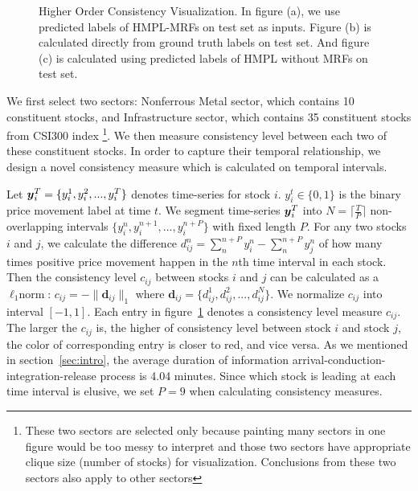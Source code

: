 \documentclass[sigconf, anonymous, review]{acmart}
\begin{document}
\begin{figure}[t]
\begin{tabular}{ccc}
  \end{tabular}
  \caption{\label{fig:consistency} Higher Order Consistency
    Visualization. In figure (a), we use predicted labels of
    HMPL-MRFs on test set as inputs. Figure (b) is calculated
    directly from ground truth labels on test set. And figure (c)
    is calculated using predicted labels of HMPL without MRFs on
    test set.}
\end{figure}

We first select two sectors: Nonferrous Metal sector, which
contains 10 constituent stocks, and Infrastructure sector, which
contains 35 constituent stocks from CSI300 index \footnote{These
  two sectors are selected only because painting many sectors in
  one figure would be too messy to interpret and those two
  sectors have appropriate clique size (number of stocks) for
  visualization. Conclusions from these two sectors also apply to
  other sectors}. We then measure consistency level between each
two of these constituent stocks. In order to capture their
temporal relationship, we design a novel consistency measure
which is calculated on temporal intervals.

Let ${\boldsymbol{y}}_i^T=\{y_i^1,y_i^2,...,y_i^T\}$ denotes time-series for
stock $i$. $y_i^t\in \{0,1\}$ is the binary price movement label
at time $t$. We segment time-series ${\boldsymbol{y}}_i^T$ into
$N=\lceil\frac{T}{P}\rceil$ non-overlapping intervals
$\{y_i^n,y_i^{n+1},...,y_i^{n+P}\}$ with fixed length $P$. For
any two stocks $i$ and $j$, we calculate the difference
$d_{ij}^n=\sum_n^{n+P}{y_i^n}-\sum_n^{n+P}{y_j^n}$ of how many
times positive price movement happen in the $n$th time interval
in each stock. Then the consistency level $c_{ij}$ between stocks
$i$ and $j$ can be calculated as a $\ell_1\text{norm}$:
$c_{ij}=-\|\mathbf{d}_{ij}\|_1$ where
$\mathbf{d}_{ij}=\{d_{ij}^1,d_{ij}^2,...,d_{ij}^N\}$. We
normalize $c_{ij}$ into interval $[-1,1]$. Each entry in
figure~\ref{fig:consistency} denotes a consistency level measure
$c_{ij}$. The larger the $c_{ij}$ is, the higher of consistency
level between stock $i$ and stock $j$, the color of corresponding
entry is closer to red, and vice versa. As we mentioned in
section~\ref{sec:intro}, the average duration of information
arrival-conduction-integration-release process is 4.04 minutes.
Since which stock is leading at each time interval is elusive, we
set $P=9$ when calculating consistency measures.
\end{document}
